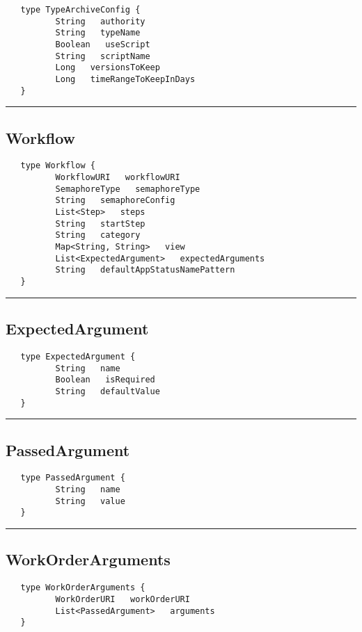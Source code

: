 \begin{verbatim}
   type TypeArchiveConfig {
          String   authority
          String   typeName
          Boolean   useScript
          String   scriptName
          Long   versionsToKeep
          Long   timeRangeToKeepInDays
   }
\end{verbatim}

\rule{15cm}{2pt}
\subsection{Workflow}
\label{type:Workflow}

\begin{verbatim}
   type Workflow {
          WorkflowURI   workflowURI
          SemaphoreType   semaphoreType
          String   semaphoreConfig
          List<Step>   steps
          String   startStep
          String   category
          Map<String, String>   view
          List<ExpectedArgument>   expectedArguments
          String   defaultAppStatusNamePattern
   }
\end{verbatim}

\rule{15cm}{2pt}
\subsection{ExpectedArgument}
\label{type:ExpectedArgument}

\begin{verbatim}
   type ExpectedArgument {
          String   name
          Boolean   isRequired
          String   defaultValue
   }
\end{verbatim}

\rule{15cm}{2pt}
\subsection{PassedArgument}
\label{type:PassedArgument}

\begin{verbatim}
   type PassedArgument {
          String   name
          String   value
   }
\end{verbatim}

\rule{15cm}{2pt}
\subsection{WorkOrderArguments}
\label{type:WorkOrderArguments}

\begin{verbatim}
   type WorkOrderArguments {
          WorkOrderURI   workOrderURI
          List<PassedArgument>   arguments
   }
\end{verbatim}

